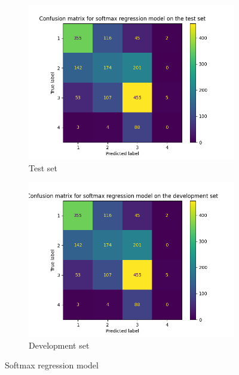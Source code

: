 \documentclass{article}
\begin{document}
\begin{appendices}
	\begin{figure}[h]
		\centering
		\begin{subfigure}[t]{0.49\textwidth}
			\centering
			\includegraphics[width=\textwidth]{sais_confusion_matrix_softmax_regression_test.png}
			\caption{Test set}
		\end{subfigure}
		\hfil
		\begin{subfigure}[t]{0.49\textwidth}
			\centering
			\includegraphics[width=\textwidth]{sais_confusion_matrix_softmax_regression_development.png}
			\caption{Development set}
		\end{subfigure}
		\caption{Softmax regression model}
	\end{figure}


	

\end{appendices}
	
\newpage


\end{document}
